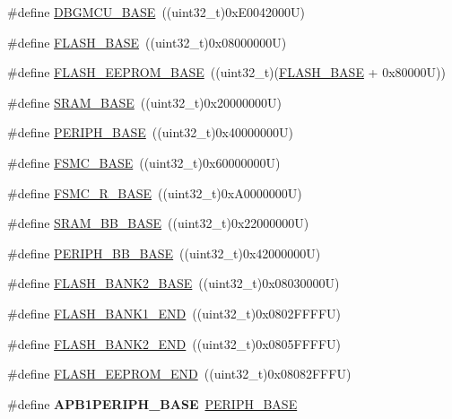 \begin{DoxyCompactItemize}
\item 
\#define \hyperlink{group___peripheral__memory__map_ga4adaf4fd82ccc3a538f1f27a70cdbbef}{D\-B\-G\-M\-C\-U\-\_\-\-B\-A\-S\-E}~((uint32\-\_\-t)0x\-E0042000\-U)
\item 
\#define \hyperlink{group___peripheral__memory__map_ga23a9099a5f8fc9c6e253c0eecb2be8db}{F\-L\-A\-S\-H\-\_\-\-B\-A\-S\-E}~((uint32\-\_\-t)0x08000000\-U)
\item 
\#define \hyperlink{group___peripheral__memory__map_ga45b9071c81cb72a66e2e3195343fcb3a}{F\-L\-A\-S\-H\-\_\-\-E\-E\-P\-R\-O\-M\-\_\-\-B\-A\-S\-E}~((uint32\-\_\-t)(\hyperlink{group___peripheral__memory__map_ga23a9099a5f8fc9c6e253c0eecb2be8db}{F\-L\-A\-S\-H\-\_\-\-B\-A\-S\-E} + 0x80000\-U))
\item 
\#define \hyperlink{group___peripheral__memory__map_ga05e8f3d2e5868754a7cd88614955aecc}{S\-R\-A\-M\-\_\-\-B\-A\-S\-E}~((uint32\-\_\-t)0x20000000\-U)
\item 
\#define \hyperlink{group___peripheral__memory__map_ga9171f49478fa86d932f89e78e73b88b0}{P\-E\-R\-I\-P\-H\-\_\-\-B\-A\-S\-E}~((uint32\-\_\-t)0x40000000\-U)
\item 
\#define \hyperlink{group___peripheral__memory__map_ga679200df61ecb0695d72c030fdeb50a9}{F\-S\-M\-C\-\_\-\-B\-A\-S\-E}~((uint32\-\_\-t)0x60000000\-U)
\item 
\#define \hyperlink{group___peripheral__memory__map_gaddf0e199dccba83272b20c9fb4d3aaed}{F\-S\-M\-C\-\_\-\-R\-\_\-\-B\-A\-S\-E}~((uint32\-\_\-t)0x\-A0000000\-U)
\item 
\#define \hyperlink{group___peripheral__memory__map_gad3548b6e2f017f39d399358f3ac98454}{S\-R\-A\-M\-\_\-\-B\-B\-\_\-\-B\-A\-S\-E}~((uint32\-\_\-t)0x22000000\-U)
\item 
\#define \hyperlink{group___peripheral__memory__map_gaed7efc100877000845c236ccdc9e144a}{P\-E\-R\-I\-P\-H\-\_\-\-B\-B\-\_\-\-B\-A\-S\-E}~((uint32\-\_\-t)0x42000000\-U)
\item 
\#define \hyperlink{group___peripheral__memory__map_ga289057b052162696849fef25b656d3d9}{F\-L\-A\-S\-H\-\_\-\-B\-A\-N\-K2\-\_\-\-B\-A\-S\-E}~((uint32\-\_\-t)0x08030000\-U)
\item 
\#define \hyperlink{group___peripheral__memory__map_ga443a2786535d83e32dfdc2b29e379332}{F\-L\-A\-S\-H\-\_\-\-B\-A\-N\-K1\-\_\-\-E\-N\-D}~((uint32\-\_\-t)0x0802\-F\-F\-F\-F\-U)
\item 
\#define \hyperlink{group___peripheral__memory__map_gab24a21b645aaab8737af5603c3d11e71}{F\-L\-A\-S\-H\-\_\-\-B\-A\-N\-K2\-\_\-\-E\-N\-D}~((uint32\-\_\-t)0x0805\-F\-F\-F\-F\-U)
\item 
\#define \hyperlink{group___peripheral__memory__map_gac8cb9b66893a7c4bdff3258909af027a}{F\-L\-A\-S\-H\-\_\-\-E\-E\-P\-R\-O\-M\-\_\-\-E\-N\-D}~((uint32\-\_\-t)0x08082\-F\-F\-F\-U)
\item 
\hypertarget{group___peripheral__memory__map_ga45666d911f39addd4c8c0a0ac3388cfb}{\#define {\bfseries A\-P\-B1\-P\-E\-R\-I\-P\-H\-\_\-\-B\-A\-S\-E}~\hyperlink{group___peripheral__memory__map_ga9171f49478fa86d932f89e78e73b88b0}{P\-E\-R\-I\-P\-H\-\_\-\-B\-A\-S\-E}}\label{group___peripheral__memory__map_ga45666d911f39addd4c8c0a0ac3388cfb}


\end{DoxyCompactItemize}
